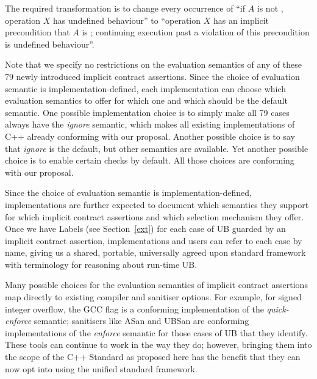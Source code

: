 The required transformation is to change every occurrence of “if $A$ is not , operation $X$ has undefined behaviour'' to ``operation $X$ has an implicit precondition that $A$ is ; continuing execution past a violation of this precondition is undefined behaviour''.

Note that we specify no restrictions on the evaluation semantics of any of these 79 newly introduced  implicit contract assertions. Since the choice of evaluation semantic is implementation-defined, each implementation can choose which evaluation semantics to offer for which one and which should be the default semantic. One possible implementation choice is to simply make all 79 cases always have the \emph{ignore} semantic, which makes all existing implementations of C++ already conforming with our proposal. Another possible choice is to say that  \emph{ignore} is the default, but other semantics are available. Yet another possible choice is to enable certain checks by default. All those choices are conforming with our proposal.

Since the choice of evaluation semantic is  implementation-defined, implementations are further expected to document which semantics they support for which implicit contract assertions and which selection mechanism they offer. Once we have Labels (see Section~\ref{ext}) for each case of UB guarded by an implicit contract assertion, implementations and users can refer to each case by name, giving us a shared, portable, universally agreed upon standard framework with terminology for reasoning about run-time UB.

Many possible choices for the evaluation semantics of implicit contract assertions map directly to existing compiler and sanitiser options. For example, for signed integer overflow, the GCC flag  is a conforming implementation of the \emph{quick-enforce} semantic; sanitisers like ASan and UBSan are conforming implementations of the \emph{enforce} semantic for those cases of UB that they identify. These tools can continue to work in the way they do; however, bringing them into the scope of the C++ Standard as proposed here has the benefit that they can now opt into using the unified standard framework.

